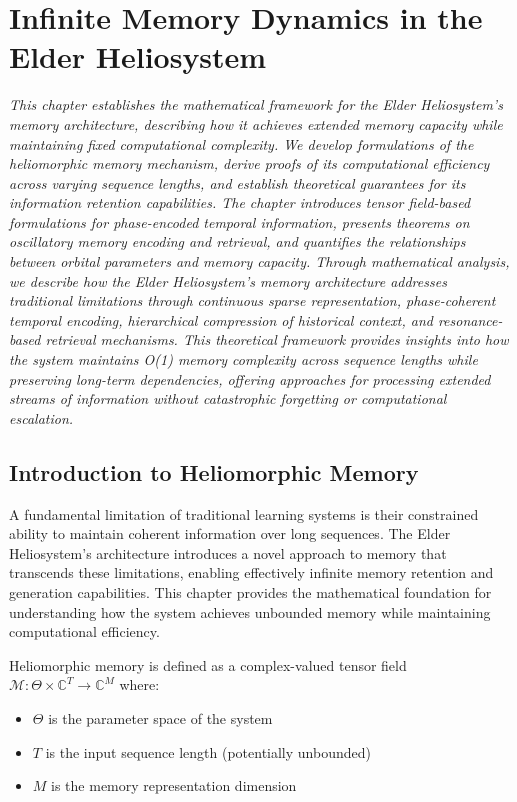 \chapter{Infinite Memory Dynamics in the Elder Heliosystem}

\textit{This chapter establishes the mathematical framework for the Elder Heliosystem's memory architecture, describing how it achieves extended memory capacity while maintaining fixed computational complexity. We develop formulations of the heliomorphic memory mechanism, derive proofs of its computational efficiency across varying sequence lengths, and establish theoretical guarantees for its information retention capabilities. The chapter introduces tensor field-based formulations for phase-encoded temporal information, presents theorems on oscillatory memory encoding and retrieval, and quantifies the relationships between orbital parameters and memory capacity. Through mathematical analysis, we describe how the Elder Heliosystem's memory architecture addresses traditional limitations through continuous sparse representation, phase-coherent temporal encoding, hierarchical compression of historical context, and resonance-based retrieval mechanisms. This theoretical framework provides insights into how the system maintains O(1) memory complexity across sequence lengths while preserving long-term dependencies, offering approaches for processing extended streams of information without catastrophic forgetting or computational escalation.}

\section{Introduction to Heliomorphic Memory}

A fundamental limitation of traditional learning systems is their constrained ability to maintain coherent information over long sequences. The Elder Heliosystem's architecture introduces a novel approach to memory that transcends these limitations, enabling effectively infinite memory retention and generation capabilities. This chapter provides the mathematical foundation for understanding how the system achieves unbounded memory while maintaining computational efficiency.

\begin{definition}
Heliomorphic memory is defined as a complex-valued tensor field $\mathcal{M}: \Theta \times \mathbb{C}^T \rightarrow \mathbb{C}^M$ where:
\begin{itemize}
    \item $\Theta$ is the parameter space of the system
    \item $T$ is the input sequence length (potentially unbounded)
    \item $M$ is the memory representation dimension
\end{itemize}
\end{definition}

